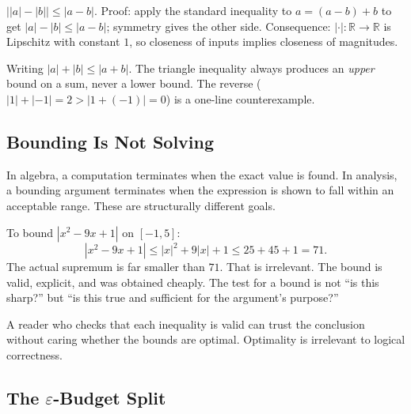 \begin{remark}
\label{rem:reverse-tri}
$\bigl\lvert|a|-|b|\bigr\rvert\leq|a-b|$. Proof: apply the standard
inequality to $a=(a-b)+b$ to get $|a|-|b|\leq|a-b|$; symmetry gives the
other side. Consequence: $|\cdot|:\mathbb{R}\to\mathbb{R}$ is Lipschitz
with constant $1$, so closeness of inputs implies closeness of magnitudes.
\end{remark}

\begin{remark}
Writing $|a|+|b|\leq|a+b|$. The triangle inequality always produces an
\emph{upper} bound on a sum, never a lower bound. The reverse
($|1|+|-1|=2>|1+(-1)|=0$) is a one-line counterexample.
\end{remark}



\subsection*{Bounding Is Not Solving}
\label{subsec:bounding-not-solving}

In algebra, a computation terminates when the exact value is found. In
analysis, a bounding argument terminates when the expression is shown to
fall within an acceptable range. These are structurally different goals.

\begin{remark}
To bound $|x^2-9x+1|$ on $[-1,5]$:
\[
  |x^2-9x+1|\leq|x|^2+9|x|+1\leq 25+45+1=71.
\]
The actual supremum is far smaller than $71$. That is irrelevant. The bound
is valid, explicit, and was obtained cheaply. The test for a bound is not
``is this sharp?'' but ``is this true and sufficient for the argument's
purpose?''
\end{remark}

\begin{remark}
A reader who checks that each inequality is valid can trust the conclusion
without caring whether the bounds are optimal. Optimality is irrelevant to
logical correctness.
\end{remark}

\subsection*{The $\varepsilon$-Budget Split}
\label{subsec:budget-split}

